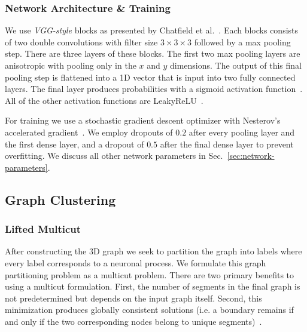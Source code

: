 \subsubsection{Network Architecture \& Training}

We use \textit{VGG-style} blocks as presented by Chatfield et al.~\cite{chatfield2014return}. 
Each blocks consists of two double convolutions with filter size $3\times3\times3$ followed by a max pooling step. 
There are three layers of these blocks. 
The first two max pooling layers are anisotropic with pooling only in the $x$ and $y$ dimensions. 
The output of this final pooling step is flattened into a 1D vector that is input into two fully connected layers. 
The final layer produces probabilities with a sigmoid activation function~\cite{funahashi1989approximate}. 
All of the other activation functions are LeakyReLU~\cite{maas2013rectifier}.

For training we use a stochastic gradient descent optimizer with Nesterov's accelerated gradient~\cite{nesterov1983method}. 
We employ dropouts of $0.2$ after every pooling layer and the first dense layer, and a dropout of $0.5$ after the final dense layer to prevent overfitting. 
We discuss all other network parameters in Sec.~\ref{sec:network-parameters}.

\subsection{Graph Clustering}

\subsubsection{Lifted Multicut}

After constructing the 3D graph we seek to partition the graph into labels where every label corresponds to a neuronal process. 
We formulate this graph partitioning problem as a multicut problem.
There are two primary benefits to using a multicut formulation. 
First, the number of segments in the final graph is not predetermined but depends on the input graph itself. 
Second, this minimization produces globally consistent solutions (i.e. a boundary remains if and only if the two corresponding nodes belong to unique segments)~\cite{keuper2015efficient}.

